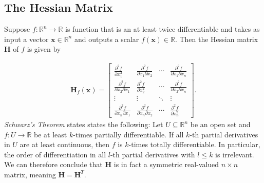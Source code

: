 \subsection{The Hessian Matrix}
\label{sec:hessian}

Suppose \( f: \mathbb{R}^n \to \mathbb{R} \) is function that is an at least twice differentiable and takes as input a vector \( \mathbf{x} \in \mathbb{R}^n \) and 
outputs a scalar \( f(\mathbf{x}) \in \mathbb{R} \). Then the Hessian matrix \( \mathbf{H} \) of \( f \) is given by

\begin{align}
    \label{eq:hessian}
    \mathbf{H}_f(\mathbf{x}) = \begin{bmatrix}
    \frac{\partial^2 f}{\partial x_1^2} & \frac{\partial^2 f}{\partial x_1 \partial x_2} & \cdots & \frac{\partial^2 f}{\partial x_1 \partial x_n} \\
    \frac{\partial^2 f}{\partial x_2 \partial x_1} & \frac{\partial^2 f}{\partial x_2^2} & \cdots & \frac{\partial^2 f}{\partial x_2 \partial x_n} \\
    \vdots & \vdots & \ddots & \vdots \\
    \frac{\partial^2 f}{\partial x_n \partial x_1} & \frac{\partial^2 f}{\partial x_n \partial x_2} & \cdots & \frac{\partial^2 f}{\partial x_n^2}
    \end{bmatrix}.
\end{align}
\emph{Schwarz's Theorem} states states the following: Let \( U \subseteq \mathbb{R}^n \) be an open set and \( f \colon U \to \mathbb{R} \) be at least \( k \)-times partially differentiable.
If all \( k \)-th partial derivatives in \( U \) are at least continuous, then \( f \) is \( k \)-times totally differentiable.
In particular, the order of differentiation in all \( l \)-th partial derivatives with \( l \leq k \) is irrelevant\cite{arens2011mathematik}.  \\
We can therefore conclude that \( \mathbf{H} \) is in fact a symmetric real-valued $n\times n$ matrix, meaning \( \mathbf{H} = \mathbf{H}^T \).\\
